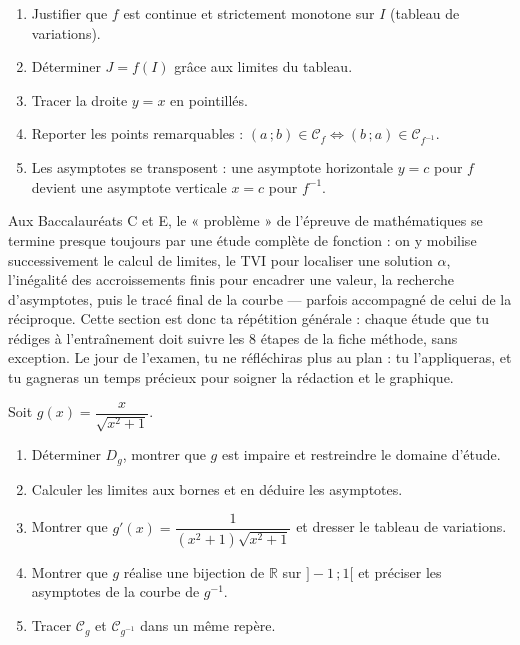 \documentclass[11pt]{article}
\begin{document}
\begin{methode}
\begin{enumerate}
\item Justifier que $f$ est continue et strictement monotone sur $I$ (tableau de variations).
\item Déterminer $J = f(I)$ grâce aux limites du tableau.
\item Tracer la droite $y = x$ en pointillés.
\item Reporter les points remarquables : $(a\,; b) \in \mathcal{C}_f \iff (b\,; a) \in \mathcal{C}_{f^{-1}}$.
\item Les asymptotes se transposent : une asymptote horizontale $y = c$ pour $f$ devient une asymptote verticale $x = c$ pour $f^{-1}$.
\end{enumerate}
\end{methode}

\begin{savaistu}
Aux Baccalauréats C et E, le « problème » de l'épreuve de mathématiques se termine presque toujours par une étude complète de fonction : on y mobilise successivement le calcul de limites, le TVI pour localiser une solution $\alpha$, l'inégalité des accroissements finis pour encadrer une valeur, la recherche d'asymptotes, puis le tracé final de la courbe — parfois accompagné de celui de la réciproque. Cette section est donc ta répétition générale : chaque étude que tu rédiges à l'entraînement doit suivre les 8 étapes de la fiche méthode, sans exception. Le jour de l'examen, tu ne réfléchiras plus au plan : tu l'appliqueras, et tu gagneras un temps précieux pour soigner la rédaction et le graphique.
\end{savaistu}

\begin{exercice}
Soit $g(x) = \dfrac{x}{\sqrt{x^2 + 1}}$.
\begin{enumerate}
\item Déterminer $D_g$, montrer que $g$ est impaire et restreindre le domaine d'étude.
\item Calculer les limites aux bornes et en déduire les asymptotes.
\item Montrer que $g'(x) = \dfrac{1}{(x^2+1)\sqrt{x^2+1}}$ et dresser le tableau de variations.
\item Montrer que $g$ réalise une bijection de $\mathbb{R}$ sur $]-1\,; 1[$ et préciser les asymptotes de la courbe de $g^{-1}$.
\item Tracer $\mathcal{C}_g$ et $\mathcal{C}_{g^{-1}}$ dans un même repère.
\end{enumerate}
\end{exercice}
\end{document}
